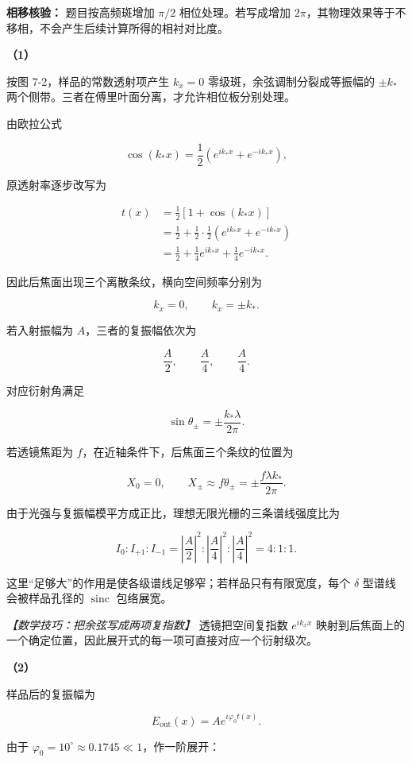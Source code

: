 \documentclass[12pt,a4paper,UTF8]{ctexart}
\begin{document}
\textbf{相移核验：} 题目按高频斑增加 \(\pi/2\) 相位处理。若写成增加
\(2\pi\)，其物理效果等于不移相，不会产生后续计算所得的相衬对比度。

\textbf{（1）}

按图 7-2，样品的常数透射项产生 \(k_x=0\) 零级斑，余弦调制分裂成等振幅的
\(\pm k_*\) 两个侧带。三者在傅里叶面分离，才允许相位板分别处理。

由欧拉公式

\[\cos(k_*x)=\frac12\left(e^{ik_*x}+e^{-ik_*x}\right),\]

原透射率逐步改写为

\[\begin{aligned}
t(x)
&=\frac12\left[1+\cos(k_*x)\right]\\
&=\frac12+\frac12\cdot\frac12
\left(e^{ik_*x}+e^{-ik_*x}\right)\\
&=\frac12+\frac14e^{ik_*x}+\frac14e^{-ik_*x}.
\end{aligned}\]

因此后焦面出现三个离散条纹，横向空间频率分别为

\[k_x=0,\qquad k_x=\pm k_*.\]

若入射振幅为 \(A\)，三者的复振幅依次为

\[\frac A2,\qquad \frac A4,\qquad \frac A4.\]

对应衍射角满足

\[\sin\theta_{\pm}=\pm\frac{k_*\lambda}{2\pi}.\]

若透镜焦距为 \(f\)，在近轴条件下，后焦面三个条纹的位置为

\[X_0=0,\qquad
X_{\pm}\approx f\theta_{\pm}
=\pm\frac{f\lambda k_*}{2\pi}.\]

由于光强与复振幅模平方成正比，理想无限光栅的三条谱线强度比为

\[I_0:I_{+1}:I_{-1}
=\left|\frac A2\right|^2:
\left|\frac A4\right|^2:
\left|\frac A4\right|^2
=4:1:1.\]

这里``足够大''的作用是使各级谱线足够窄；若样品只有有限宽度，每个
\(\delta\) 型谱线会被样品孔径的 \(\operatorname{sinc}\) 包络展宽。

\emph{【数学技巧：把余弦写成两项复指数】} 透镜把空间复指数 \(e^{ik_xx}\)
映射到后焦面上的一个确定位置，因此展开式的每一项可直接对应一个衍射级次。

\textbf{（2）}

样品后的复振幅为

\[E_{\mathrm{out}}(x)=Ae^{i\varphi_0t(x)}.\]

由于 \(\varphi_0=10^\circ\approx0.1745\ll1\)，作一阶展开：
\end{document}
